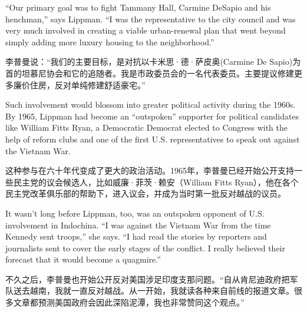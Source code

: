 \ifdefined\eng
``Our primary goal was to fight Tammany Hall, Carmine DeSapio and his henchman,'' says Lippman. ``I was the representative to the city council and was very much involved in creating a viable urban-renewal plan that went beyond simply adding more luxury housing to the neighborhood.''
\fi

\ifdefined\chs
李普曼说：``我们的主要目标，是对抗以卡米思·德·萨皮奥(Carmine De Sapio)为首的坦慕尼协会和它的追随者。我是市政委员会的一名代表委员。主要提议修建更多廉价住房，反对单纯修建舒适豪宅。''
\fi

\ifdefined\eng
Such involvement would blossom into greater political activity during the 1960s. By 1965, Lippman had become an ``outspoken'' supporter for political candidates like William Fitts Ryan, a \ifdefined\vone Democratic \fi\ifdefined\vtwo Democrat \fi elected to Congress with the help of reform clubs and one of the first U.S. representatives to speak out against the Vietnam War.
\fi

\ifdefined\chs
这种参与在六十年代变成了更大的政治活动。1965年，李普曼已经开始公开支持一些民主党的议会候选人，比如威廉·菲茨·赖安（William Fitts Ryan），他在各个民主党改革俱乐部的帮助下，进入议会，并成为当时第一批反对越战的议员。
\fi

\ifdefined\eng
It wasn't long before Lippman, too, was an outspoken opponent of U.S. involvement in Indochina. ``I was against the Vietnam War from the time Kennedy sent troops,'' she says. ``I had read the stories by reporters and journalists sent to cover the early stages of the conflict. I really believed their forecast that it would become a quagmire.''
\fi

\ifdefined\chs
不久之后，李普曼也开始公开反对美国涉足印度支那问题。``自从肯尼迪政府把军队送去越南，我就一直反对越战。从一开始，我就读各种来自前线的报道文章。很多文章都预测美国政府会因此深陷泥潭，我也非常赞同这个观点。''
\fi


